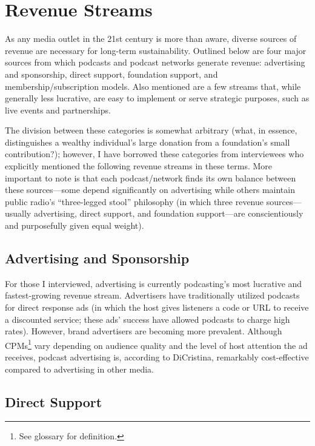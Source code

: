 \documentclass[notoc, symmetric, nobib, nols]{towcenter-guideto-book}
\begin{document}
\chapter{Revenue Streams}

As any media outlet in the 21st century is more than aware, diverse sources of revenue are necessary for long-term sustainability. Outlined below are four major sources from which podcasts and podcast networks generate revenue: advertising and sponsorship, direct support, foundation support, and membership/subscription models. Also mentioned are a few streams that, while generally less lucrative, are easy to implement or serve strategic purposes, such as live events and partnerships.

The division between these categories is somewhat arbitrary (what, in essence, distinguishes a wealthy individual's large donation from a foundation's small contribution?); however, I have borrowed these categories from interviewees who explicitly mentioned the following revenue streams in these terms. More important to note is that each podcast/network finds its own balance between these sources---some depend significantly on advertising while others maintain public radio's ``three-legged stool'' philosophy (in which three revenue sources---usually advertising, direct support, and foundation support---are conscientiously and purposefully given equal weight). 

\section{Advertising and Sponsorship}

For those I interviewed, advertising is currently podcasting's most lucrative and fastest-growing revenue stream. Advertisers have traditionally utilized podcasts for direct response ads (in which the host gives listeners a code or URL to receive a discounted service; these ads' success have allowed podcasts to charge high rates).\autocite{bowers} However, brand advertisers are becoming more prevalent. Although CPMs\footnote{See glossary for definition.} vary depending on audience quality and the level of host attention the ad receives, podcast advertising is, according to DiCristina, remarkably cost-effective compared to advertising in other media.\autocite{mailchimp}

\section{Direct Support}
\end{document}
